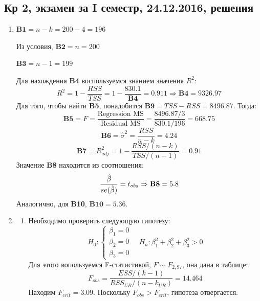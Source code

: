 \documentclass[12pt, a4paper]{article}\usepackage[]{graphicx}\usepackage[]{color}
\begin{document}
\subsection{Кр 2, экзамен за I семестр, 24.12.2016, решения}

\begin{enumerate}
\item $\textbf{B1} = n - k = 200 - 4 = 196$

Из условия, $\textbf{B2} = n = 200$

$\textbf{B3} = n - 1  = 199$

Для нахождения \textbf{B4} воспользуемся знанием значения $R^2$:
\[
R^2 = 1 - \frac{RSS}{TSS} = 1 - \frac{830.1}{\textbf{B4}} = 0.911 \Rightarrow \textbf{B4} = 9326.97
\]
Для того, чтобы найти \textbf{B5}, понадобится $\textbf{B9} = TSS - RSS = 8496.87$. Тогда:
\[
\textbf{B5} = F = \frac{\text{Regression MS}}{\text{Residual MS}} = \frac{8496.87/3}{830.1/196} = 668.75
\]
\[
\textbf{B6} = \hat{\sigma}^2 = \frac{RSS}{n-k} = 4.24
\]
\[
\textbf{B7} = R^2_{adj} = 1 - \frac{RSS/(n-k)}{TSS/(n-1)} = 0.91
\]
Значение \textbf{B8} находится из соотношения:
\[
\frac{\hat{\beta}}{se(\hat{\beta})} = t_{obs} \Rightarrow \textbf{B8} = 5.8
\]
Аналогично, для \textbf{B10}, $\textbf{B10} = 5.36$.


\item
\begin{enumerate}
\item Необходимо проверить следующую гипотезу:
\[
H_0: \begin{cases}
\beta_1 = 0 \\
\beta_2 = 0 \\
\beta_3 = 0
\end{cases}
\quad
H_a: \beta_1^2 + \beta_2^2 + \beta_3^2 >0
\]
Для этого вопользуемся F-статистикой, $F \sim F_{2,97}$, она дана в таблице:
\[
F_{obs} = \frac{ESS/(k-1)}{RSS_{UR}/(n-k_{UR})} = 14.464
\]
Находим $F_{crit} = 3.09$. Поскольку $F_{obs} > F_{crit}$, гипотеза отвергается.


\end{enumerate}
\end{enumerate}
\end{document}
